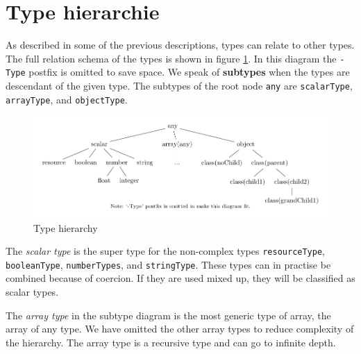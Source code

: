 \documentclass[../main.tex]{subfiles}
\begin{document}
    \section{Type hierarchie}\label{sec:type_hierarchie}
    
    As described in some of the previous descriptions, types can relate to other types.
    The full relation schema of the types is shown in figure \ref{fig:type_hierarchie}.
    In this diagram the \texttt{-Type} postfix is omitted to save space.
    We speak of \textbf{subtypes} when the types are descendant of the given type.
    The subtypes of the root node \texttt{any} are \texttt{scalarType}, \texttt{arrayType}, and \texttt{objectType}.
    
    \begin{figure}[H]
        \includegraphics{Diagrams/Subtypes.pdf}
        \caption{Type hierarchy}
        \label{fig:type_hierarchie}
    \end{figure}
    

    The \textit{scalar type} is the super type for the non-complex types \texttt{resourceType}, \texttt{booleanType}, \texttt{numberTypes}, and \texttt{stringType}.
    These types can in practise be combined because of coercion.
    If they are used mixed up, they will be classified as scalar types.
    
	The \textit{array type} in the subtype diagram is the most generic type of array, the array of any type.
	We have omitted the other array types to reduce complexity of the hierarchy.
	The array type is a recursive type and can go to infinite depth.
 
\end{document}

